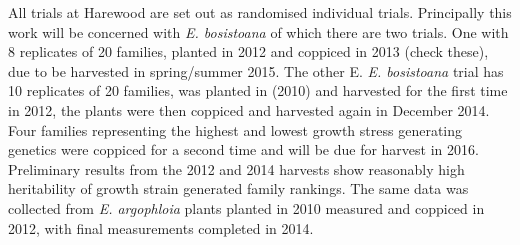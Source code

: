 All trials at Harewood are set out as randomised individual trials. Principally
this work will be concerned with \textit{E. bosistoana} of which there  are two
trials. One with 8 replicates of 20 families, planted in 2012 and coppiced in
2013 (check these), due to be harvested in spring/summer 2015. The other E.
\textit{E. bosistoana} trial has 10 replicates of 20 families, was planted in
(2010) and harvested for the first time in 2012, the plants were then coppiced
and harvested again in December 2014. Four families representing the highest and
lowest growth stress generating genetics were coppiced for a second time and
will be due for harvest in 2016. Preliminary results from the 2012 and 2014
harvests show reasonably high heritability of growth strain generated family
rankings. The same data was collected from \textit{E. argophloia} plants planted
in 2010 measured and coppiced in 2012, with final measurements completed in 2014.